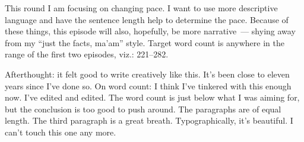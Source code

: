 This round I am focusing on changing pace. I want to use more descriptive language and have the sentence length help to determine the pace. Because of these things, this episode will also, hopefully, be more narrative~--- shying away from my ``just the facts, ma'am'' style. Target word count is anywhere in the range of the first two episodes, viz.: 221--282.

Afterthought: it felt good to write creatively like this. It's been close to eleven years since I've done so. On word count: I think I've tinkered with this enough now. I've edited and edited. The word count is just below what I was aiming for, but the conclusion is too good to push around. The paragraphs are of equal length. The third paragraph is a great breath. Typographically, it's beautiful. I can't touch this one any more.
